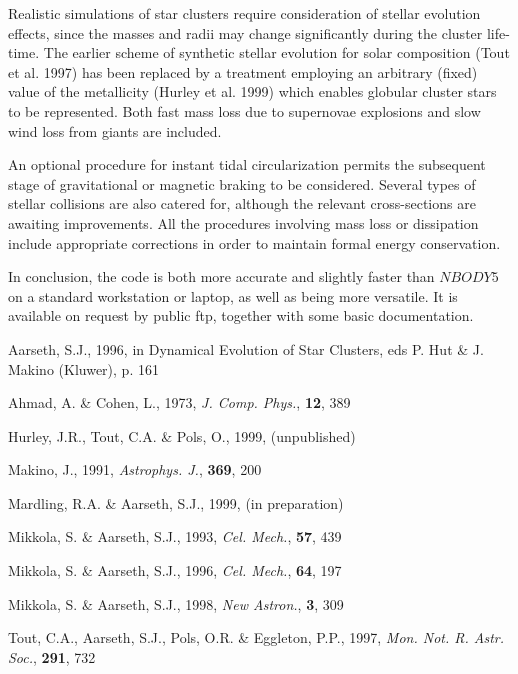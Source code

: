 \documentclass[12pt]{article}
\def\ZZ#1{$\scriptstyle #1$}
\begin{document}
{\color{yuck}
\medskip
Realistic simulations of star clusters require consideration of stellar
evolution effects, since the masses and radii may change significantly
during the cluster life-time.
The earlier scheme of synthetic stellar evolution for solar composition
(Tout et al. 1997) has been replaced by a treatment employing an arbitrary
(fixed) value of the metallicity (Hurley et al. 1999) which enables
globular cluster stars to be represented.
Both fast mass loss due to supernovae explosions and slow wind loss
from giants are included.

\color{yuck2}
\medskip
An optional procedure for instant tidal circularization permits the
subsequent stage of gravitational or magnetic braking to be considered.
Several types of stellar collisions are also catered for, although the
relevant cross-sections are awaiting improvements.
All the procedures involving mass loss or dissipation include appropriate
corrections in order to maintain formal energy conservation.

\color{blue}
\medskip
In conclusion, the code is both more accurate and slightly
faster than \ZZ {NBODY5} on a standard workstation or laptop, as well as
being more versatile.
It is available on request by public ftp, together with some basic
documentation.

}
\bigskip

\color{black}
\begin{thebibliography}{}
\addtolength{\leftmargin}{0.7cm}
\setlength{\itemindent}{-0.7cm}

{\Large
\item[] Aarseth, S.J., 1996, in Dynamical Evolution of Star Clusters, eds
P. Hut \& J. Makino (Kluwer), p. 161
\item[] Ahmad, A. \& Cohen, L., 1973, {\it J. Comp. Phys.}, {\bf 12}, 389
\item[] Hurley, J.R., Tout, C.A. \& Pols, O., 1999, (unpublished)
\item[] Makino, J., 1991, {\it Astrophys. J.}, {\bf 369}, 200
\item[] Mardling, R.A. \& Aarseth, S.J., 1999, (in preparation)
\item[] Mikkola, S. \& Aarseth, S.J., 1993, {\it Cel. Mech.}, {\bf 57}, 439
\item[] Mikkola, S. \& Aarseth, S.J., 1996, {\it Cel. Mech.}, {\bf 64}, 197
\item[] Mikkola, S. \& Aarseth, S.J., 1998, {\it New Astron.}, {\bf 3}, 309
\item[] Tout, C.A., Aarseth, S.J., Pols, O.R. \& Eggleton, P.P., 1997,
{\it Mon. Not. R. Astr. Soc.}, {\bf 291}, 732

}
\end{thebibliography}
\end{document}
